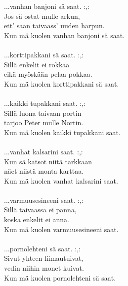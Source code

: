             ...vanhan banjoni sä saat. :,: \\
            Jos sä ostat mulle arkun, \\
            ett’ saan taivaass’ uuden harpun. \\
            Kun mä kuolen vanhan banjoni sä saat. \\
\hspace{10mm} \\
            ...korttipakkani sä saat. :,: \\
            Sillä enkelit ei rokkaa \\
            eikä myöskään pelaa pokkaa. \\
            Kun mä kuolen korttipakkani sä saat. \\
\hspace{10mm} \\
            ...kaikki tupakkani saat. :,: \\
            Sillä luona taivaan portin \\
            tarjoo Peter mulle Nortin. \\
            Kun mä kuolen kaikki tupakkani saat. \\
\hspace{10mm} \\
            ...vanhat kalsarini saat. :,: \\
            Kun sä katsot niitä tarkkaan \\
            näet niistä monta karttaa. \\
            Kun mä kuolen vanhat kalsarini saat. \\
\hspace{10mm} \\
            ...varmuusesineeni saat. :,: \\
            Sillä taivaassa ei panna, \\
            koska enkelit ei anna. \\
            Kun mä kuolen varmuusesineeni saat. \\
\hspace{10mm} \\
            ...pornolehteni sä saat. :,: \\
            Sivut yhteen liimautuivat, \\
            vedin niihin monet kuivat. \\
            Kun mä kuolen pornolehteni sä saat. \\
\hspace{10mm} \\
